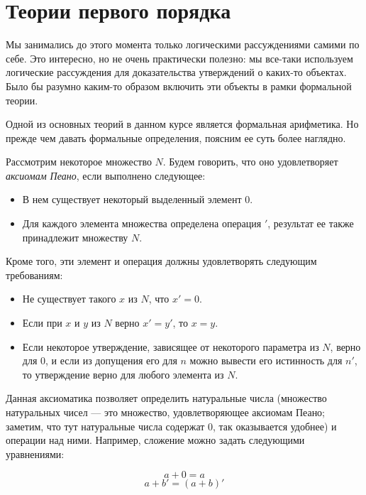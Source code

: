 \section{Теории первого порядка}

Мы занимались до этого момента только логическими рассуждениями самими по 
себе. Это интересно, но не очень практически полезно: мы все-таки
используем логические рассуждения для доказательства утверждений о каких-то
объектах. Было бы разумно каким-то образом включить эти объекты в рамки
формальной теории.


Одной из основных теорий в данном курсе является формальная арифметика.
Но прежде чем давать формальные определения, поясним ее суть более наглядно.

Рассмотрим некоторое множество $N$. Будем говорить, что оно удовлетворяет
\emph{аксиомам Пеано}, если выполнено следующее:

\begin{itemize}
\item В нем существует некоторый выделенный элемент 0.
\item Для каждого элемента множества определена операция $'$, результат ее
также принадлежит множеству $N$.
\end{itemize}

Кроме того, эти элемент и операция должны удовлетворять следующим требованиям:
\begin{itemize}
\item Не существует такого $x$ из $N$, что $x'=0$.
\item Если при $x$ и $y$ из $N$ верно $x'=y'$, то $x=y$.
\item Если некоторое утверждение, зависящее от некоторого параметра из $N$, 
верно для $0$, и если из допущения его для $n$ можно вывести его истинность 
для $n'$, то утверждение верно для любого элемента из $N$.
\end{itemize}

Данная аксиоматика позволяет определить натуральные числа (множество натуральных
чисел --- это множество, удовлетворяющее аксиомам Пеано; заметим, что тут натуральные
числа содержат 0, так оказывается удобнее) и операции над
ними. Например, сложение можно задать следующими уравнениями:

$$a+0 = a$$
$$a+b' = (a+b)'$$

